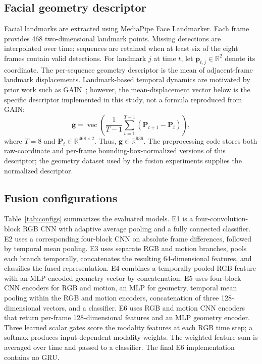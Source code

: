 \documentclass[a4paper,conference]{IEEEtran}
\begin{document}
\subsection{Facial geometry descriptor}
Facial landmarks are extracted using MediaPipe Face Landmarker. Each frame provides 468 two-dimensional landmark points. Missing detections are interpolated over time; sequences are retained when at least six of the eight frames contain valid detections. For landmark $j$ at time $t$, let $\mathbf{p}_{t,j}\in\mathbb{R}^2$ denote its coordinate. The per-sequence geometry descriptor is the mean of adjacent-frame landmark displacements. Landmark-based temporal dynamics are motivated by prior work such as GAIN~\cite{chang2023geometry}; however, the mean-displacement vector below is the specific descriptor implemented in this study, not a formula reproduced from GAIN:
\begin{equation}
\mathbf{g}=\operatorname{vec}\left(\frac{1}{T-1}\sum_{t=1}^{T-1}(\mathbf{P}_{t+1}-\mathbf{P}_t)\right),
\label{eq:geometry}
\end{equation}
where $T=8$ and $\mathbf{P}_t\in\mathbb{R}^{468\times2}$. Thus, $\mathbf{g}\in\mathbb{R}^{936}$. The preprocessing code stores both raw-coordinate and per-frame bounding-box-normalized versions of this descriptor; the geometry dataset used by the fusion experiments supplies the normalized descriptor.

\subsection{Fusion configurations}
Table~\ref{tab:configs} summarizes the evaluated models. E1 is a four-convolution-block RGB CNN with adaptive average pooling and a fully connected classifier. E2 uses a corresponding four-block CNN on absolute frame differences, followed by temporal mean pooling. E3 uses separate RGB and motion branches, pools each branch temporally, concatenates the resulting 64-dimensional features, and classifies the fused representation. E4 combines a temporally pooled RGB feature with an MLP-encoded geometry vector by concatenation. E5 uses four-block CNN encoders for RGB and motion, an MLP for geometry, temporal mean pooling within the RGB and motion encoders, concatenation of three 128-dimensional vectors, and a classifier. E6 uses RGB and motion CNN encoders that return per-frame 128-dimensional features and an MLP geometry encoder. Three learned scalar gates score the modality features at each RGB time step; a softmax produces input-dependent modality weights. The weighted feature sum is averaged over time and passed to a classifier. The final E6 implementation contains no GRU.
\end{document}
